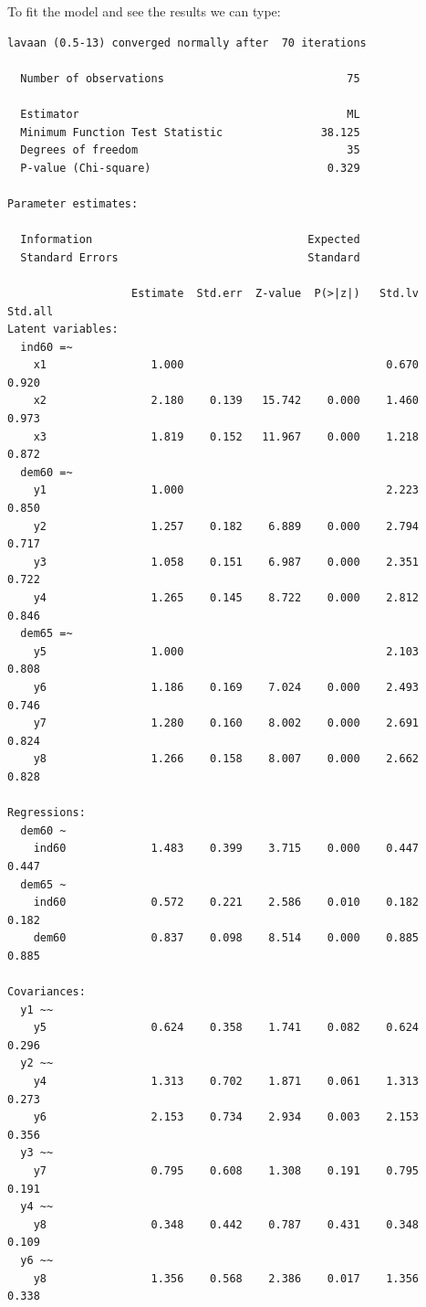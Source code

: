 To fit the model and see the results we can type:

\begin{Shaded}
\begin{Highlighting}[]
\StringTok{ } 
 \NormalTok{)}
\end{Highlighting}
\end{Shaded}

\begin{verbatim}
lavaan (0.5-13) converged normally after  70 iterations

  Number of observations                            75

  Estimator                                         ML
  Minimum Function Test Statistic               38.125
  Degrees of freedom                                35
  P-value (Chi-square)                           0.329

Parameter estimates:

  Information                                 Expected
  Standard Errors                             Standard

                   Estimate  Std.err  Z-value  P(>|z|)   Std.lv  Std.all
Latent variables:
  ind60 =~
    x1                1.000                               0.670    0.920
    x2                2.180    0.139   15.742    0.000    1.460    0.973
    x3                1.819    0.152   11.967    0.000    1.218    0.872
  dem60 =~
    y1                1.000                               2.223    0.850
    y2                1.257    0.182    6.889    0.000    2.794    0.717
    y3                1.058    0.151    6.987    0.000    2.351    0.722
    y4                1.265    0.145    8.722    0.000    2.812    0.846
  dem65 =~
    y5                1.000                               2.103    0.808
    y6                1.186    0.169    7.024    0.000    2.493    0.746
    y7                1.280    0.160    8.002    0.000    2.691    0.824
    y8                1.266    0.158    8.007    0.000    2.662    0.828

Regressions:
  dem60 ~
    ind60             1.483    0.399    3.715    0.000    0.447    0.447
  dem65 ~
    ind60             0.572    0.221    2.586    0.010    0.182    0.182
    dem60             0.837    0.098    8.514    0.000    0.885    0.885

Covariances:
  y1 ~~
    y5                0.624    0.358    1.741    0.082    0.624    0.296
  y2 ~~
    y4                1.313    0.702    1.871    0.061    1.313    0.273
    y6                2.153    0.734    2.934    0.003    2.153    0.356
  y3 ~~
    y7                0.795    0.608    1.308    0.191    0.795    0.191
  y4 ~~
    y8                0.348    0.442    0.787    0.431    0.348    0.109
  y6 ~~
    y8                1.356    0.568    2.386    0.017    1.356    0.338


\end{verbatim}
